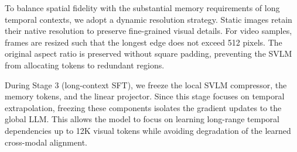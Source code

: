 To balance spatial fidelity with the substantial memory requirements of long temporal contexts, we adopt a dynamic resolution strategy. Static images retain their native resolution to preserve fine-grained visual details. For video samples, frames are resized such that the longest edge does not exceed 512 pixels. The original aspect ratio is preserved without square padding, preventing the SVLM from allocating tokens to redundant regions.

During Stage 3 (long-context SFT), we freeze the local SVLM compressor, the memory tokens, and the linear projector. Since this stage focuses on temporal extrapolation, freezing these components isolates the gradient updates to the global LLM. This allows the model to focus on learning long-range temporal dependencies up to 12K visual tokens while avoiding degradation of the learned cross-modal alignment.